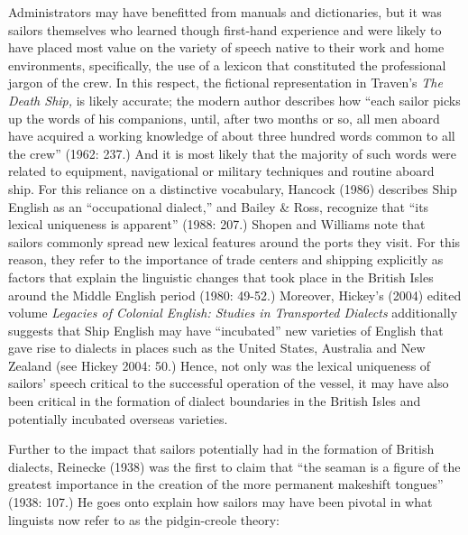 \documentclass[12pt]{article}
\newenvironment{styleStandard}{\renewcommand\baselinestretch{1.0}\setlength\leftskip{0cm}\setlength\rightskip{0cm plus 1fil}\setlength\parindent{0cm}\setlength\parfillskip{0pt plus 1fil}\setlength\parskip{0in plus 1pt}\writerlistparindent\writerlistleftskip\leavevmode\normalfont\normalsize\writerlistlabel\ignorespaces}{\unskip\vspace{0in plus 1pt}\par}
\newcommand\writerlistleftskip{}
\newcommand\writerlistparindent{}
\newcommand\writerlistlabel{}
\begin{document}
\begin{styleStandard}
Administrators may have benefitted from manuals and dictionaries, but it was sailors themselves who learned though first-hand experience and were likely to have placed most value on the variety of speech native to their work and home environments, specifically, the use of a lexicon that constituted the professional jargon of the crew. In this respect, the fictional representation in Traven’s \textit{The Death Ship, }is likely accurate; the modern author describes how “each sailor picks up the words of his companions, until, after two months or so, all men aboard have acquired a working knowledge of about three hundred words common to all the crew” (1962: 237.) And it is most likely that the majority of such words were related to equipment, navigational or military techniques and routine aboard ship. For this reliance on a distinctive vocabulary, Hancock (1986) describes Ship English as an “occupational dialect,” and Bailey \& Ross, recognize that “its lexical uniqueness is apparent” (1988: 207.) Shopen and Williams note that sailors commonly spread new lexical features around the ports they visit. For this reason, they refer to the importance of trade centers and shipping explicitly as factors that explain the linguistic changes that took place in the British Isles around the Middle English period (1980: 49-52.) Moreover, Hickey’s (2004) edited volume \textit{Legacies of Colonial English: Studies in Transported Dialects} additionally suggests that Ship English may have “incubated” new varieties of English that gave rise to dialects in places such as the United States, Australia and New Zealand (see Hickey 2004: 50.) Hence, not only was the lexical uniqueness of sailors’ speech critical to the successful operation of the vessel, it may have also been critical in the formation of dialect boundaries in the British Isles and potentially incubated overseas varieties.
\end{styleStandard}


\begin{styleStandard}
Further to the impact that sailors potentially had in the formation of British dialects, Reinecke (1938) was the first to claim that “the seaman is a figure of the greatest importance in the creation of the more permanent makeshift tongues” (1938: 107.) He goes onto explain how sailors may have been pivotal in what linguists now refer to as the pidgin-creole theory:
\end{styleStandard}
\end{document}
